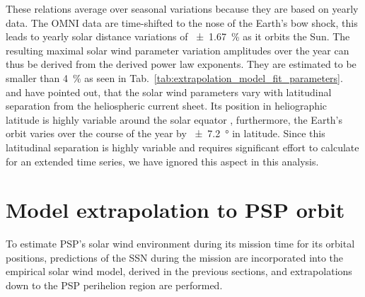 These relations average over seasonal variations because they are based on yearly data. The OMNI data are time-shifted to the nose of the Earth’s bow shock, this leads to yearly solar distance variations of \SI{+-1.67}{\%} as it orbits the Sun. The resulting maximal solar wind parameter variation amplitudes over the year can thus be derived from the derived power law exponents. They are estimated to be smaller than \SI{4}{\percent} as seen in Tab.~\ref{tab:extrapolation_model_fit_parameters}. \citet{Bruno1986} and \citet{Balogh1999} have pointed out, that the solar wind parameters vary with latitudinal separation from the heliospheric current sheet. Its position in heliographic latitude is highly variable around the solar equator \citep{Schwenn1990}, furthermore, the Earth’s orbit varies over the course of the year by \SI{+-7.2}{\degree} in latitude. Since this latitudinal separation is highly variable and requires significant effort to calculate for an extended time series, we have ignored this aspect in this analysis.	%


\section{Model extrapolation to PSP orbit}
\label{sec:model_extrapolation_to_psp_orbit}
To estimate PSP’s solar wind environment during its mission time for its orbital positions, predictions of the SSN during the mission are incorporated into the empirical solar wind model, derived in the previous sections, and extrapolations down to the PSP perihelion region are performed.

